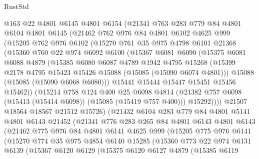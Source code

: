 \begin{lexlean}{RustStd}
\begin{coremodule}
    @163
    @22
    @4801
    @6145
    @4801
    @6154
    (@21341
      @763
      @283
      @779
      @84
      @4801
      @6104
      @4801
      @6145
      (@21462
        @762
        @976
        @84
        @4801
        @6102
        @4625
        @999
        (@15205
          @762
          @976
          @6102
          (@15270
            @761
            @35
            @975
            @4798
            @6101
            @21368
            (@15360
              @760
              @22
              @974
              @6092
              @6100
              (@15367
                @6081
                @6090
                (@15375
                  @6081
                  @6088
                  @4879
                  (@15385
                    @6080
                    @6087
                    @4789
                    @1942
                    @4795
                    @15268
                    (@15399 @2178 @4795 @15423 @15426 @15088 (@15085 (@15090 @6074 @4801)))
                    @15088
                    (@15085 (@15090 @6068 @6080)))
                  @15441
                  @15444
                  @15447
                  @15451
                  @15456
                  @15462))
              (@15214
                @758
                @124
                @400
                @25
                @6098
                @4814
                (@21382 @757 @6098 (@15413 (@15414 @6098)) (@15085 (@15419 @757 @400)))
                @15292))))
        @21507
        @18564
        @18567
        @21512
        @15726)
      (@21432
        @6104
        @283
        @779
        @84
        @4801
        @5141
        @4801
        @6143
        @21452
        (@21341
          @776
          @283
          @265
          @84
          @4801
          @6143
          @4801
          @6143
          (@21462
            @775
            @976
            @84
            @4801
            @6141
            @4625
            @999
            (@15205
              @775
              @976
              @6141
              (@15270
                @774
                @35
                @975
                @4854
                @6140
                @15285
                (@15360
                  @773
                  @22
                  @974
                  @6131
                  @6139
                  (@15367
                    @6120
                    @6129
                    (@15375
                      @6120
                      @6127
                      @4879
                      (@15385
                        @6119

\end{coremodule}
\end{lexlean}
